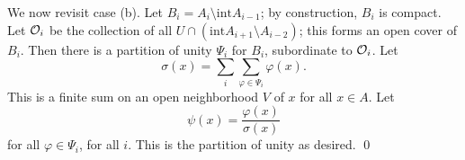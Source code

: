 We now revisit case (b). Let $B_i = A_i \setminus \mathrm{int} A_{i-1}$; by construction, $B_i$ is compact. Let $\mathcal O_i$ be the collection of all $U \cap (\mathrm{int} A_{i+1} \setminus A_{i-2})$; this forms an open cover of $B_i$. Then there is a partition of unity $\Psi_i$ for $B_i$, subordinate to $\mathcal O_i$. Let
\[ \sigma(x) = \sum_i \sum_{\varphi \in \Psi_i} \varphi(x). \]
This is a finite sum on an open neighborhood $V$ of $x$ for all $x \in A$. Let
\[ \psi(x) = \frac{\varphi(x)}{\sigma(x)} \]
for all $\varphi \in \Psi_i$, for all $i$. This is the partition of unity as desired. \qed